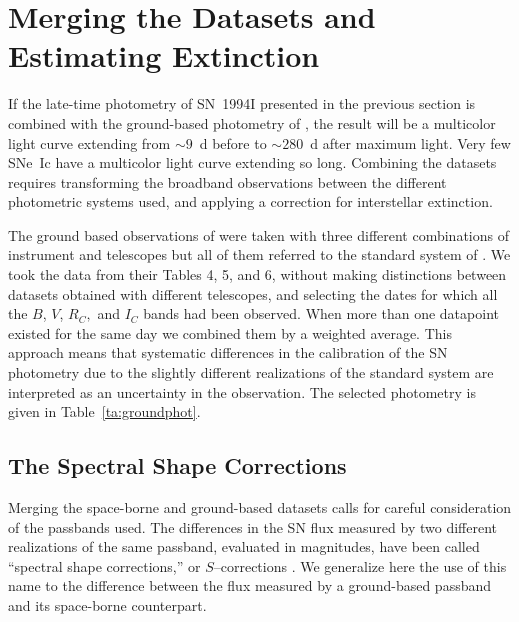 \documentclass[12pt,manuscript]{aastex}
\begin{document}
\section{Merging the Datasets and Estimating Extinction} \label{se:merging}

If the late-time photometry of SN~1994I presented in the previous 
section is combined with the ground-based photometry of 
\citet{retal96}, the result will be a multicolor light curve 
extending from $\sim 9$~d before to $\sim 280$~d after maximum light.
%
Very few SNe~Ic have a multicolor light curve extending so long.
%
Combining the datasets requires transforming the broadband 
observations between the different photometric systems used, 
and applying a correction for interstellar extinction.

The ground based observations of \citet{retal96} were taken with three
different combinations of instrument and telescopes but all of them
referred to the standard system of \citet{bessell90}.
%
We took the data from their Tables 4, 5, and 6, without making 
distinctions between datasets obtained with different telescopes,
and selecting the dates for which all the $B$, $V$, $R_C,$ and $I_C$ bands
had been observed.
%
When more than one datapoint existed for the same day we combined them
by a weighted average.
%
This approach means that systematic differences in the calibration of the SN
photometry due to the slightly different realizations of the standard system
are interpreted as an uncertainty in the observation.
%
The selected photometry is given in Table~\ref{ta:groundphot}.


\subsection{The Spectral Shape Corrections}

\label{sse:s_corrections}

Merging the space-borne and ground-based datasets calls for
careful consideration of the passbands used.
%
The differences in the SN flux measured by two different 
realizations of the same passband, evaluated in magnitudes, 
have been called ``spectral shape corrections,'' or $S$--corrections
\citep{setal02,ketal04,petal04}.
%
We generalize here the use of this name to the difference between the
flux measured by a ground-based passband and its space-borne 
counterpart.
\end{document}
